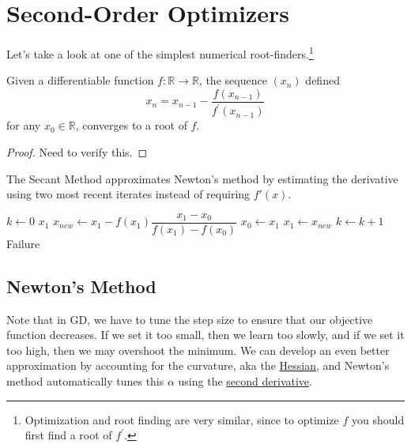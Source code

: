 \section{Second-Order Optimizers} 

	Let's take a look at one of the simplest numerical root-finders.\footnote{Optimization and root finding are very similar, since to optimize $f$ you should first find a root of $f^\prime$.}

  \begin{theorem}
    \label{thm:newton-raphson-method}
    Given a differentiable function $f: \mathbb{R} \to \mathbb{R}$, the sequence $(x_n)$ defined 
    \begin{equation}
      x_n = x_{n-1} - \frac{f(x_{n-1})}{f^\prime (x_{n-1})}
    \end{equation}
    for any $x_0 \in \mathbb{R}$, converges to a root of $f$. 
  \end{theorem}
  \begin{proof}
    Need to verify this. 
  \end{proof}

  \begin{algo}
    The Secant Method approximates Newton's method by estimating the derivative using two most recent iterates instead of requiring $f'(x)$. 
    \begin{algorithm}[H]
    \label{alg:secant}
    \begin{algorithmic}[1]

        \State $k \gets 0$
            \State \Return $x_1$
          \EndIf
          \State $x_{new} \gets x_1 - f(x_1)\dfrac{x_1 - x_0}{f(x_1) - f(x_0)}$
          \State $x_0 \gets x_1$
          \State $x_1 \gets x_{new}$
          \State $k \gets k + 1$
        \EndWhile
        \State \Return Failure
      \EndProcedure
    \end{algorithmic}
    \end{algorithm}
  \end{algo}

\subsection{Newton's Method}

	Note that in GD, we have to tune the step size to ensure that our objective function decreases. If we set it too small, then we learn too slowly, and if we set it too high, then we may overshoot the minimum. We can develop an even better approximation by accounting for the curvature, aka the \hyperref[mv-def:hessian]{Hessian}, and Newton's method automatically tunes this $\alpha$ using the \hyperref[mv-def:second-derivative]{second derivative}. 


